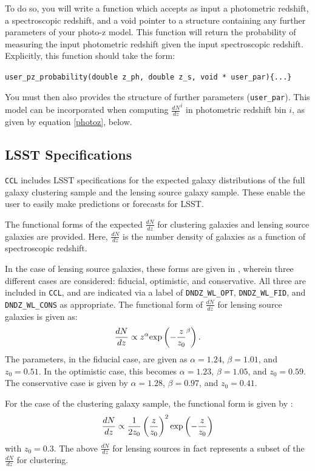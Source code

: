 \documentclass[\docopts]{\docclass}
\begin{document}
To do so, you will write a function which accepts as input a photometric redshift, a spectroscopic redshift, and a void pointer to a structure containing any further parameters of your photo-z model. This function will return the probability of measuring the input photometric redshift given the input spectroscopic redshift. Explicitly, this function should take the form:

{\tt user\_pz\_probability(double z\_ph, double z\_s, void * user\_par)\{...\}}
 
You must then also provides the structure of further parameters ({\tt user\_par}). This model can be incorporated when computing $\frac{dN}{dz}^i$ in photometric redshift bin $i$, as given by equation \ref{photoz}, below.



\subsection{LSST Specifications}
\label{sec:specs}

{\tt CCL} includes LSST specifications for the expected galaxy distributions of the full galaxy clustering sample and the lensing source galaxy sample. These enable the user to easily make predictions or forecasts for LSST.

The functional forms of the expected $\frac{dN}{dz}$ for clustering galaxies and lensing source galaxies are provided. Here, $\frac{dN}{dz}$ is the number density of galaxies as a function of spectroscopic redshift. 

In the case of lensing source galaxies, these forms are given in \cite{Chang2013}, wherein three different cases are considered: fiducial, optimistic, and conservative. All three are included in {\tt CCL}, and are indicated via a label of {\tt DNDZ\_WL\_OPT}, {\tt DNDZ\_WL\_FID}, and {\tt DNDZ\_WL\_CONS} as appropriate. The functional form of $\frac{dN}{dz}$ for lensing source galaxies is given as:
\begin{equation}
\frac{dN}{dz} \propto z^\alpha {\rm exp}\left(-\frac{z}{z_0}^\beta\right).
\label{dndz_src}
\end{equation}
The parameters, in the fiducial case, are given as $\alpha=1.24$, $\beta=1.01$, and $z_0=0.51$. In the optimistic case, this becomes $\alpha=1.23$, $\beta=1.05$, and $z_0=0.59$. The conservative case is given by $\alpha=1.28$, $\beta=0.97$, and $z_0=0.41$. 

For the case of the clustering galaxy sample, the functional form is given by \cite{ScienceBook}:
\begin{equation}
\frac{dN}{dz} \propto \frac{1}{2z_0}\left(\frac{z}{z_0}\right)^2 {\rm exp}\left(-\frac{z}{z_0}\right)
\label{dndz_clust}
\end{equation}
with $z_0=0.3$. The above $\frac{dN}{dz}$ for lensing sources in fact represents a subset of the $\frac{dN}{dz}$ for clustering.
\end{document}
